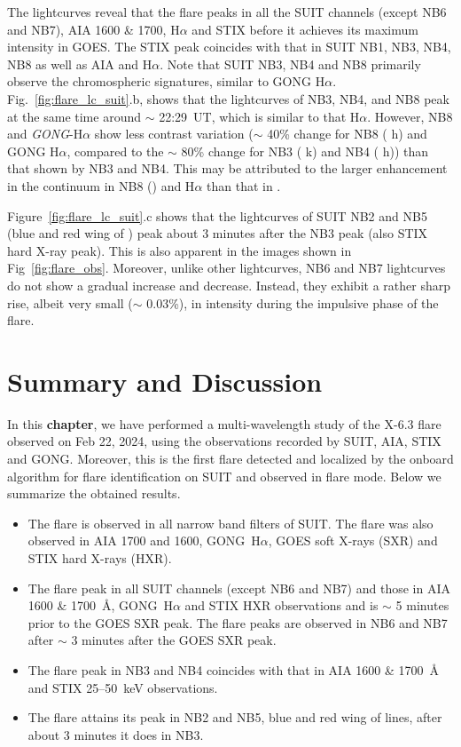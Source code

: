 The lightcurves reveal that the flare peaks in all the SUIT channels (except NB6 and NB7), AIA 1600 \& 1700, H$\alpha$ and STIX before it achieves its maximum intensity in GOES. The STIX peak coincides with that in SUIT NB1, NB3, NB4, NB8 as well as AIA and H$\alpha$. Note that SUIT NB3, NB4 and NB8 primarily observe the chromospheric signatures, similar to GONG H$\alpha$. Fig.~\ref{fig:flare_lc_suit}.b, shows that the lightcurves of NB3, NB4, and NB8 peak at the same time around $\sim$ 22:29~UT, which is similar to that H$\alpha$. However, NB8 and {\it GONG}-H$\alpha$ show less contrast variation ($\sim$ 40\% change for NB8 ( h) and GONG H$\alpha$, compared to the $\sim$ 80\% change for NB3 ( k) and NB4 ( h)) than that shown by NB3 and NB4. This may be attributed to the larger enhancement in the continuum in NB8 () and H$\alpha$ than that in .

Figure~\ref{fig:flare_lc_suit}.c shows that the lightcurves of SUIT NB2 and NB5 (blue and red wing of ) peak about 3 minutes after the NB3 peak (also STIX hard X-ray peak). This is also apparent in the images shown in Fig~\ref{fig:flare_obs}. Moreover, unlike other lightcurves, NB6 and NB7 lightcurves do not show a gradual increase and decrease. Instead, they exhibit a rather sharp rise, albeit very small ($\sim$ 0.03\%), in intensity during the impulsive phase of the flare.

\section{Summary and Discussion}\label{sec:disc}

In this {\bf chapter}, we have performed a multi-wavelength study of the X-6.3 flare observed on Feb 22, 2024, using the observations recorded by SUIT, AIA, STIX and GONG. Moreover, this is the first flare detected and localized by the onboard algorithm for flare identification on SUIT and observed in flare mode. Below we summarize the obtained results.
\begin{itemize}
    \item The flare is observed in all narrow band filters of SUIT. The flare was also observed in AIA 1700 and 1600, GONG~H$\alpha$, GOES soft X-rays (SXR) and STIX hard X-rays (HXR).
    \item The flare peak in all SUIT channels (except NB6 and NB7) and those in AIA 1600 \& 1700~{\AA}, GONG~H$\alpha$ and STIX HXR observations and is $\sim$ 5 minutes prior to the GOES SXR peak. The flare peaks are observed in NB6 and NB7 after $\sim$ 3 minutes after the GOES SXR peak.
    \item The flare peak in NB3 and NB4 coincides with that in AIA 1600 \& 1700~{\AA} and STIX 25{--}50~keV observations.
    \item The flare attains its peak in NB2 and NB5, blue and red wing of  lines, after about 3 minutes it does in NB3.    
\end{itemize}

